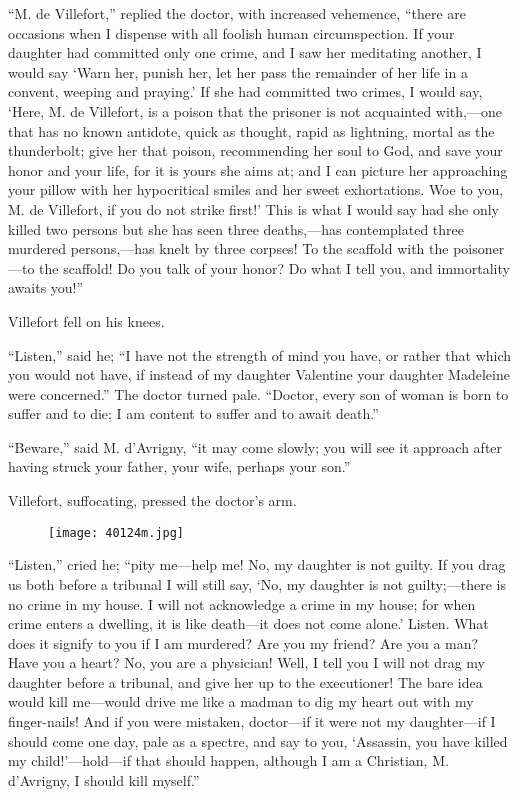“M. de Villefort,” replied the doctor, with increased vehemence, “there
are occasions when I dispense with all foolish human circumspection. If
your daughter had committed only one crime, and I saw her meditating
another, I would say ‘Warn her, punish her, let her pass the remainder
of her life in a convent, weeping and praying.’ If she had committed
two crimes, I would say, ‘Here, M. de Villefort, is a poison that the
prisoner is not acquainted with,—one that has no known antidote, quick
as thought, rapid as lightning, mortal as the thunderbolt; give her
that poison, recommending her soul to God, and save your honor and your
life, for it is yours she aims at; and I can picture her approaching
your pillow with her hypocritical smiles and her sweet exhortations.
Woe to you, M. de Villefort, if you do not strike first!’ This is what
I would say had she only killed two persons but she has seen three
deaths,—has contemplated three murdered persons,—has knelt by three
corpses! To the scaffold with the poisoner—to the scaffold! Do you talk
of your honor? Do what I tell you, and immortality awaits you!”

Villefort fell on his knees.

“Listen,” said he; “I have not the strength of mind you have, or rather
that which you would not have, if instead of my daughter Valentine your
daughter Madeleine were concerned.” The doctor turned pale. “Doctor,
every son of woman is born to suffer and to die; I am content to suffer
and to await death.”

“Beware,” said M. d’Avrigny, “it may come slowly; you will see it
approach after having struck your father, your wife, perhaps your son.”

Villefort, suffocating, pressed the doctor’s arm.

\begin{figure}[ht]
\texttt{[image: 40124m.jpg]}
\end{figure}

“Listen,” cried he; “pity me—help me! No, my daughter is not guilty. If
you drag us both before a tribunal I will still say, ‘No, my daughter
is not guilty;—there is no crime in my house. I will not acknowledge a
crime in my house; for when crime enters a dwelling, it is like
death—it does not come alone.’ Listen. What does it signify to you if I
am murdered? Are you my friend? Are you a man? Have you a heart? No,
you are a physician! Well, I tell you I will not drag my daughter
before a tribunal, and give her up to the executioner! The bare idea
would kill me—would drive me like a madman to dig my heart out with my
finger-nails! And if you were mistaken, doctor—if it were not my
daughter—if I should come one day, pale as a spectre, and say to you,
‘Assassin, you have killed my child!’—hold—if that should happen,
although I am a Christian, M. d’Avrigny, I should kill myself.”

